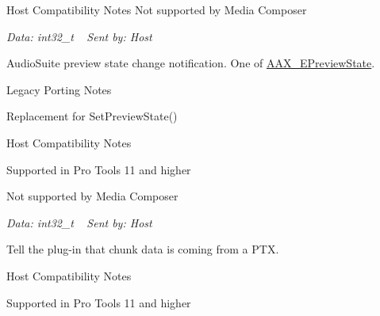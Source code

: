 \begin{Desc}
\begin{description}
\begin{DoxyRefDesc}{Host Compatibility Notes}
Not supported by Media Composer\end{DoxyRefDesc}


{\itshape Data\+: {\ttfamily int32\+\_\+t}} ~\newline
 {\itshape Sent by\+: Host} \item[{\em 
\hypertarget{a00206_afab5ea2cfd731fc8f163b6caa685406ea8ca3f7d5e93eecf945682f6fc55f5263}{}A\+A\+X\+\_\+e\+Notification\+Event\+\_\+\+A\+S\+Preview\+State\label{a00206_afab5ea2cfd731fc8f163b6caa685406ea8ca3f7d5e93eecf945682f6fc55f5263}
}]Audio\+Suite preview state change notification. One of \hyperlink{a00206_a12b280d7ccf22568759f8deb1fe1d6a8}{A\+A\+X\+\_\+\+E\+Preview\+State}. \begin{DoxyRefDesc}{Legacy Porting Notes}
\item[\hyperlink{a00384__porting_notes000021}{Legacy Porting Notes}]Replacement for {\ttfamily Set\+Preview\+State()} \end{DoxyRefDesc}


\begin{DoxyRefDesc}{Host Compatibility Notes}
\item[\hyperlink{a00380__compatibility_notes000032}{Host Compatibility Notes}]Supported in Pro Tools 11 and higher 

Not supported by Media Composer\end{DoxyRefDesc}


{\itshape Data\+: {\ttfamily int32\+\_\+t}} ~\newline
 {\itshape Sent by\+: Host} \item[{\em 
\hypertarget{a00206_afab5ea2cfd731fc8f163b6caa685406ea013a21c2c111bac54b962b40f1b4bc1f}{}A\+A\+X\+\_\+e\+Notification\+Event\+\_\+\+Session\+Being\+Opened\label{a00206_afab5ea2cfd731fc8f163b6caa685406ea013a21c2c111bac54b962b40f1b4bc1f}
}]Tell the plug-\/in that chunk data is coming from a P\+T\+X. \begin{DoxyRefDesc}{Host Compatibility Notes}
\item[\hyperlink{a00380__compatibility_notes000033}{Host Compatibility Notes}]Supported in Pro Tools 11 and higher 


\end{DoxyRefDesc}
\end{description}
\end{Desc}
